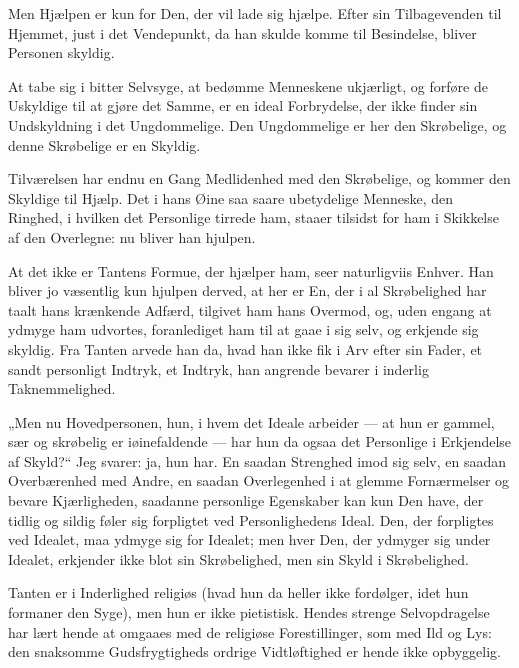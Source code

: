 \documentclass[12pt,a4paper]{book}
\newcommand{\apage}[1]{\marginnote{\footnotesize\textit{[#1]}}}
\begin{document}
Men Hjælpen er kun for Den, der vil lade sig hjælpe. Efter sin
Tilbagevenden til Hjemmet, just i det Vendepunkt, da han skulde komme til
Besindelse, bliver Personen skyldig.

At tabe sig i bitter Selvsyge, at bedømme Menneskene ukjærligt, og
forføre de Uskyldige til at gjøre det Samme, er en ideal Forbrydelse, der
ikke finder sin Undskyldning i det Ungdommelige. Den Ungdommelige er her
den Skrøbelige, og denne Skrøbelige er en Skyldig.

Tilværelsen har endnu en Gang Medlidenhed med den Skrøbelige, og kommer
den Skyldige til Hjælp. Det i hans Øine saa saare ubetydelige Menneske,
den Ringhed, i hvilken det Personlige tirrede ham, staaer tilsidst for
ham i Skikkelse af den Overlegne: nu bliver han hjulpen.

At det ikke er Tantens Formue, der hjælper ham, seer naturligviis
Enhver. Han bliver jo væsentlig kun hjulpen derved, at her er En, der i
al Skrøbelighed har taalt hans krænkende Adfærd, tilgivet ham hans
Overmod, og, uden engang at ydmyge ham udvortes, foranlediget ham til at
gaae i sig selv, og erkjende sig skyldig. Fra Tanten arvede han da, hvad
han ikke fik i Arv efter sin Fader, et sandt personligt Indtryk, et
Indtryk, han angrende bevarer i inderlig Taknemmelighed.

„Men nu Hovedpersonen, hun, i hvem det Ideale arbeider --- at hun er
gammel, sær og skrøbelig er iøinefaldende --- har hun da ogsaa det
Personlige i Erkjendelse af Skyld?“ Jeg svarer: ja, hun har. En saadan
Strenghed imod sig selv, en saadan Overbærenhed med Andre, en saadan
Overlegenhed i at glemme Fornærmelser og bevare Kjærligheden, saadanne
personlige Egenskaber kan kun Den have, der tidlig og sildig føler sig
forpligtet ved Personlighedens Ideal. Den, der forpligtes ved Idealet,
maa ydmyge sig for Idealet; men hver Den, der ydmyger sig under Idealet,
erkjender ikke blot sin Skrøbelighed, men sin Skyld i Skrøbelighed.

Tanten er i Inderlighed religiøs (hvad hun da heller ikke fordølger,
idet hun formaner den Syge), men hun er ikke pietistisk. Hendes strenge
Selvopdragelse har lært hende at omgaaes med de religiøse Forestillinger,
som med \apage{100} Ild og Lys: den snaksomme Gudsfrygtigheds ordrige Vidtløftighed
er hende ikke opbyggelig.
\end{document}

